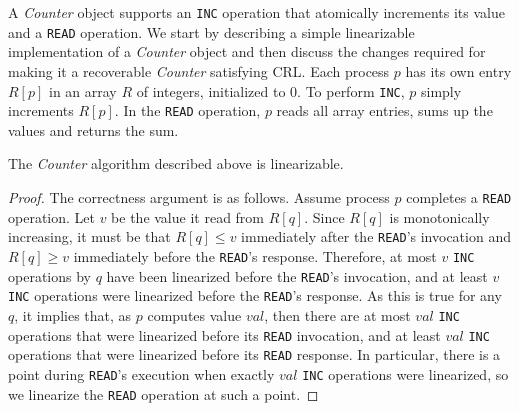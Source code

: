 A \textit{Counter} object supports an \texttt{INC} operation that atomically increments its value and a \texttt{READ} operation. We start by describing a simple linearizable implementation of a \textit{Counter} object and then discuss the changes required for making it a recoverable \textit{Counter} satisfying CRL.
Each process $p$ has its own entry $R[p]$ in an array $R$ of integers, initialized to 0. To perform \texttt{INC}, $p$ simply increments $R[p]$. In the \texttt{READ} operation, $p$ reads all array entries, sums up the values and returns the sum.

\begin{claim}
	The \textit{Counter} algorithm described above is linearizable.
\end{claim}

\begin{proof}
	The correctness argument is as follows. Assume process $p$ completes a \texttt{READ} operation. Let $v$ be the value it read from $R[q]$. Since $R[q]$ is monotonically increasing, it must be that $R[q] \leq v$ immediately after the \texttt{READ}'s invocation and $R[q] \geq v$ immediately before the \texttt{READ}'s response. Therefore, at most $v$ \texttt{INC} operations by $q$ have been linearized before the \texttt{READ}'s invocation, and at least $v$ \texttt{INC} operations were linearized before the \texttt{READ}'s response. As this is true for any $q$, it implies that, as $p$ computes value $val$, then there are at most $val$ \texttt{INC} operations that were linearized before its \texttt{READ} invocation, and at least $val$ \texttt{INC} operations that were linearized before its \texttt{READ} response. In particular, there is a point during \texttt{READ}'s execution when exactly $val$ \texttt{INC} operations were linearized, so we linearize the \texttt{READ} operation at such a point.
\end{proof} 

